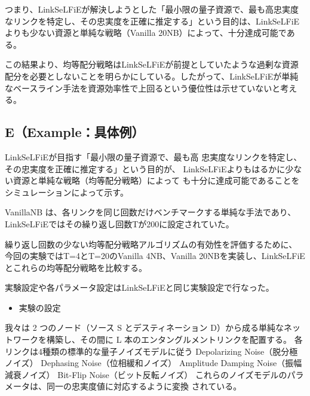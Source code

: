\documentclass[technicalreport,dvipdfmx]{ieicej}
\begin{document}
つまり、LinkSeLFiEが解決しようとした「最小限の量子資源で、最も高忠実度
なリンクを特定し、その忠実度を正確に推定する」という目的は、LinkSeLFiE
よりも少ない資源と単純な戦略（Vanilla 20NB）によって、十分達成可能である。

この結果より、均等配分戦略はLinkSeLFiEが前提としていたような過剰な資源
配分を必要としないことを明らかにしている。したがって、LinkSeLFiEが単純
なベースライン手法を資源効率性で上回るという優位性は示せていないと考え
る。
\subsection{E（Example：具体例）}
\label{sec:orgfae76ec}
LinkSeLFiEが目指す「最小限の量子資源で、最も高
忠実度なリンクを特定し、その忠実度を正確に推定する」という目的が、
LinkSeLFiEよりもはるかに少ない資源と単純な戦略（均等配分戦略）によって
も十分に達成可能であることをシミュレーションによって示す。

VanillaNB は、各リンクを同じ回数だけベンチマークする単純な手法であり、
LinkSeLFiEではその繰り返し回数Tが200に設定されていた。

繰り返し回数の少ない均等配分戦略アルゴリズムの有効性を評価するために、
今回の実験ではT=4とT=20のVanilla 4NB、Vanilla 20NBを実装し、LinkSeLFiE
とこれらの均等配分戦略を比較する。

実験設定や各パラメータ設定はLinkSeLFiEと同じ実験設定で行なった。

\begin{itemize}
\item 実験の設定
\end{itemize}
我々は 2 つのノード（ソース S とデスティネーション D）から成る単純なネッ
トワークを構築し、その間に L 本のエンタングルメントリンクを配置する。
各リンクは4種類の標準的な量子ノイズモデルに従う
Depolarizing Noise（脱分極ノイズ）
Dephasing Noise（位相緩和ノイズ）
Amplitude Damping Noise（振幅減衰ノイズ）
Bit-Flip Noise（ビット反転ノイズ）
これらのノイズモデルのパラメータは、同一の忠実度値に対応するように変換
されている。
\end{document}
